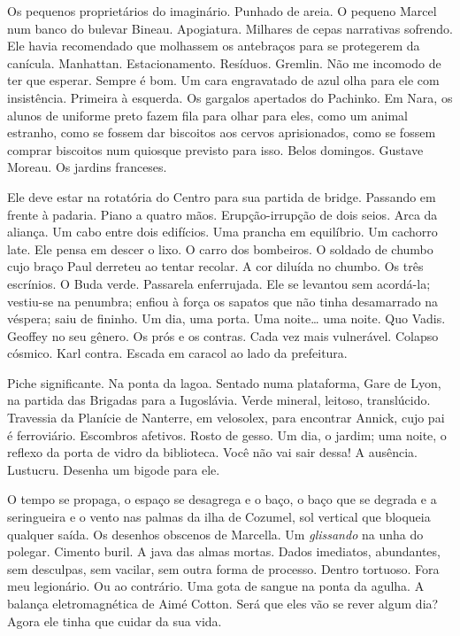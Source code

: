 Os pequenos proprietários do imaginário. Punhado de areia. O pequeno
Marcel num banco do bulevar Bineau. Apogiatura. Milhares de cepas
narrativas sofrendo. Ele havia recomendado que molhassem os antebraços
para se protegerem da canícula. Manhattan. Estacionamento. Resíduos.
Gremlin. Não me incomodo de ter que esperar. Sempre é bom. Um cara
engravatado de azul olha para ele com insistência. Primeira à esquerda.
Os gargalos apertados do Pachinko. Em Nara, os alunos de uniforme preto
fazem fila para olhar para eles, como um animal estranho, como se fossem
dar biscoitos aos cervos aprisionados, como se fossem comprar biscoitos
num quiosque previsto para isso. Belos domingos. Gustave Moreau. Os
jardins franceses.

Ele deve estar na rotatória do Centro para sua partida de bridge.
Passando em frente à padaria. Piano a quatro mãos. Erupção-irrupção de
dois seios. Arca da aliança. Um cabo entre dois edifícios. Uma prancha
em equilíbrio. Um cachorro late. Ele pensa em descer o lixo. O carro dos
bombeiros. O soldado de chumbo cujo braço Paul derreteu ao tentar
recolar. A cor diluída no chumbo. Os três escrínios. O Buda verde.
Passarela enferrujada. Ele se levantou sem acordá-la; vestiu-se na
penumbra; enfiou à força os sapatos que não tinha desamarrado na
véspera; saiu de fininho. Um dia, uma porta. Uma noite\ldots{} uma noite. Quo
Vadis. Geoffey no seu gênero. Os prós e os contras. Cada vez mais
vulnerável. Colapso cósmico. Karl contra. Escada em caracol ao lado da
prefeitura.

Piche significante. Na ponta da lagoa. Sentado numa plataforma, Gare de
Lyon, na partida das Brigadas para a Iugoslávia. Verde mineral, leitoso,
translúcido. Travessia da Planície de Nanterre, em velosolex, para
encontrar Annick, cujo pai é ferroviário. Escombros afetivos. Rosto de
gesso. Um dia, o jardim; uma noite, o reflexo da porta de vidro da
biblioteca. Você não vai sair dessa! A ausência. Lustucru. Desenha um
bigode para ele.

O tempo se propaga, o espaço se desagrega e o baço, o baço que se
degrada e a seringueira e o vento nas palmas da ilha de Cozumel, sol
vertical que bloqueia qualquer saída. Os desenhos obscenos de Marcella.
Um \emph{glissando} na unha do polegar. Cimento buril. A java das almas
mortas. Dados imediatos, abundantes, sem desculpas, sem vacilar, sem
outra forma de processo. Dentro tortuoso. Fora meu legionário. Ou ao
contrário. Uma gota de sangue na ponta da agulha. A balança
eletromagnética de Aimé Cotton. Será que eles vão se rever algum dia?
Agora ele tinha que cuidar da sua vida.

